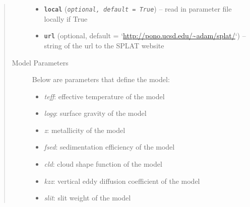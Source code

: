 \documentclass[letterpaper,10pt,english]{sphinxmanual}
\begin{document}
\begin{fulllineitems}
\begin{quote}
\begin{description}
\begin{itemize}
\begin{itemize}
\end{itemize}


\item {} 
\textbf{\texttt{local}} (\emph{\texttt{optional, default = True}}) -- read in parameter file locally if True

\item {} 
\textbf{\texttt{url}} (optional, default = `\url{http://pono.ucsd.edu/~adam/splat/}`) -- string of the url to the SPLAT website

\end{itemize}

\item[{Model Parameters}] \leavevmode
Below are parameters that define the model:
\begin{itemize}
\item {} 
\emph{teff}: effective temperature of the model

\item {} 
\emph{logg}: surface gravity of the model

\item {} 
\emph{z}: metallicity of the model

\item {} 
\emph{fsed}: sedimentation efficiency of the model

\item {} 
\emph{cld}: cloud shape function of the model

\item {} 
\emph{kzz}: vertical eddy diffusion coefficient of the model

\item {} 
\emph{slit}: slit weight of the model

\end{itemize}

\end{description}\end{quote}

\end{fulllineitems}

\end{document}
